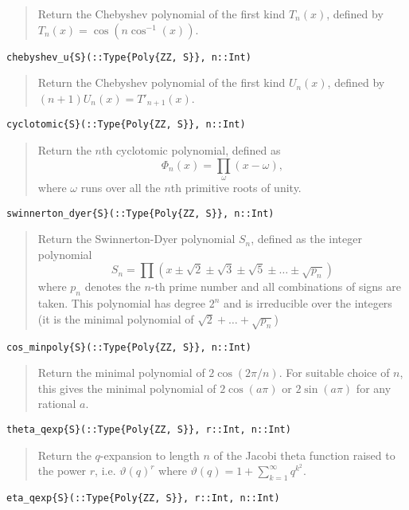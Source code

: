 \documentclass[a4paper,10pt]{article}
\newcommand{\desc}[1]{\vspace{-3mm}\begin{quote}#1\end{quote}}
\begin{document}
{{{\desc{Return the Chebyshev polynomial of the first kind $T_n(x)$, defined by 
$T_n(x) = \cos(n \cos^{-1}(x))$.}

\begin{lstlisting}
chebyshev_u{S}(::Type{Poly{ZZ, S}}, n::Int)
\end{lstlisting}

\desc{Return the Chebyshev polynomial of the first kind $U_n(x)$, defined by 
$(n+1) U_n(x) = T'_{n+1}(x)$.}

\begin{lstlisting}
cyclotomic{S}(::Type{Poly{ZZ, S}}, n::Int)
\end{lstlisting}

\desc{Return the $n$th cyclotomic polynomial, defined as
$$\Phi_n(x) = \prod_{\omega} (x-\omega),$$ where $\omega$ runs over all the 
$n$th primitive roots of unity.}

\begin{lstlisting}
swinnerton_dyer{S}(::Type{Poly{ZZ, S}}, n::Int)
\end{lstlisting}

\desc{Return the Swinnerton-Dyer polynomial $S_n$, defined as the integer 
polynomial $$S_n = \prod (x \pm \sqrt{2} \pm \sqrt{3}
\pm \sqrt{5} \pm \ldots \pm \sqrt{p_n})$$ where $p_n$ denotes the $n$-th prime 
number and all combinations of signs are taken. This polynomial has degree $2^n$
and is irreducible over the integers (it is the minimal polynomial of 
$\sqrt{2} + \ldots + \sqrt{p_n}$)}

\begin{lstlisting}
cos_minpoly{S}(::Type{Poly{ZZ, S}}, n::Int)
\end{lstlisting}

\desc{Return the minimal polynomial of $2 \cos(2 \pi / n)$. For suitable choice of 
$n$, this gives the minimal polynomial of $2 \cos(a \pi)$ or $2 \sin(a \pi)$ for any
rational $a$.}

\begin{lstlisting}
theta_qexp{S}(::Type{Poly{ZZ, S}}, r::Int, n::Int)
\end{lstlisting}

\desc{Return the $q$-expansion to length $n$ of the Jacobi theta function raised to 
the power $r$, i.e. $\vartheta(q)^r$ where 
$\vartheta(q) = 1 + \sum_{k=1}^{\infty} q^{k^2}$.}

\begin{lstlisting}
eta_qexp{S}(::Type{Poly{ZZ, S}}, r::Int, n::Int)
\end{lstlisting}

}}}
\end{document}

